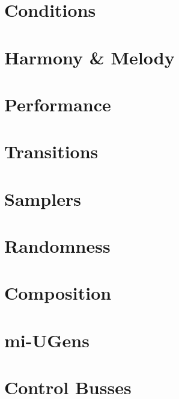 \documentclass[8pt]{extarticle} %
\begin{document}
\begin{multicols}{2}
		\section{Conditions}
		\section{Harmony \& Melody}
		\section{Performance}
		\section{Transitions}
		\section{Samplers}
		\section{Randomness}
		
		\section{Composition}
		\section{mi-UGens}
		\section{Control Busses}
			
		
	\end{multicols}
\end{document}
